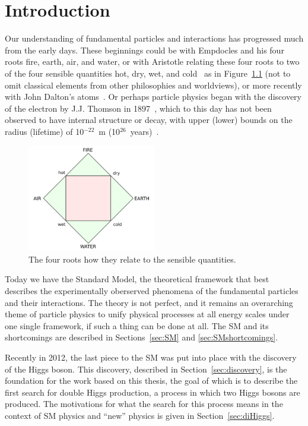 
\chapter{Introduction\label{ch:intro}}

Our understanding of fundamental particles and interactions has progressed much from the early days.
These beginnings could be with Empdocles and his four roots fire, earth, air, and water, or with
Aristotle relating these four roots to two of the four sensible quantities hot, dry, wet, and
cold~\cite{0415078547} as in Figure~\ref{fig:aristotle}
(not to omit classical elements from other philosophies and worldviews), or more recently with
John Dalton's atoms~\cite{dalton}. Or perhaps particle physics began with
the discovery of the electron by J.J. Thomson in 1897~\cite{thomson:electron},
which to this day has not been observed
to have internal structure or decay, with upper (lower) bounds on the radius (lifetime) of
10$^{-22}$~m (10$^{26}$~years)~\cite{1988PhST...22..102D,2002PhLB..525...29B}.

\begin{figure}[ht]
 \begin{center}
    \includegraphics[width=0.50\textwidth]{figures/intro/Four_elements_representation.png}
      \end{center}
\caption{The four roots how they relate to the sensible quantities.}
\label{fig:aristotle}
\end{figure}

Today we have the Standard Model, the theoretical framework that best describes the
experimentally oberserved phenomena of the fundamental particles and their interactions. The theory
is not perfect, and it remains an overarching theme of particle physics to unify physical processes
at all energy scales under one single framework, if such a thing can be done at all.
The SM and its shortcomings are described in
Sections~\ref{sec:SM} and \ref{sec:SMshortcomings}.

Recently in 2012, the last piece to the SM was put into place with the discovery of the Higgs boson.
This discovery, described in Section~\ref{sec:discovery}, is the foundation for the work based on
this thesis, the goal of which is to describe the first search for double Higgs production, a process
in which two Higgs bosons are produced. The motivations for what the search for this process means
in the context of SM physics and ``new'' physics is given in Section~\ref{sec:diHiggs}.


